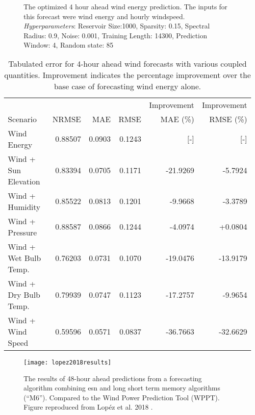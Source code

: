 \begin{figure*}[h]
  \centering
  
  \caption{The optimized 4 hour ahead wind energy prediction. The inputs for this forecast were wind energy and hourly windspeed. \textit{Hyperparameters}: Reservoir Size:1000, Sparsity: 0.15, Spectral Radius: 0.9, Noise: 0.001, Training Length: 14300, Prediction Window: 4, Random state: 85}
  \label{fig:wind04}
\end{figure*}
  \begin{table*}[h]
    \centering
    \caption{Tabulated error for 4-hour ahead wind forecasts with various coupled quantities. Improvement indicates the percentage improvement over the base case of forecasting wind energy alone.}
    \label{tab:wind04}
    \begin{tabular}{l|r|r|r|r|r}
      & & & & Improvement & Improvement \\
      Scenario &NRMSE & MAE & RMSE & MAE (\%) & RMSE (\%)\\
      \hline
      Wind Energy & 0.88507 &0.0903 & 0.1243 & [-] & [-] \\
      Wind + Sun Elevation & 0.83394 &0.0705 & 0.1171 & -21.9269 & -5.7924 \\
      Wind + Humidity & 0.85522 & 0.0813 & 0.1201 & -9.9668 & -3.3789 \\
      Wind + Pressure & 0.88587 & 0.0866 & 0.1244 & -4.0974 & +0.0804 \\
      Wind + Wet Bulb Temp. & 0.76203 & 0.0731 & 0.1070 & -19.0476 & -13.9179 \\
      Wind + Dry Bulb Temp. & 0.79939 & 0.0747 & 0.1123 & -17.2757 & -9.9654 \\
      Wind + Wind Speed & 0.59596 & 0.0571 & 0.0837 & -36.7663 & -32.6629 \\
    \end{tabular}
  \end{table*}

\begin{figure}
  \texttt{[image: lopez2018results]}
  \caption{The results of 48-hour ahead predictions from a forecasting algorithm combining \gls{esn}
  and long short term memory algorithms (``M6''). Compared to the Wind Power Prediction
  Tool (WPPT). Figure reproduced from Lop\'ez et al. 2018
  \cite{lopez_wind_2018}.}
  \label{fig:lopez2018}
\end{figure}
